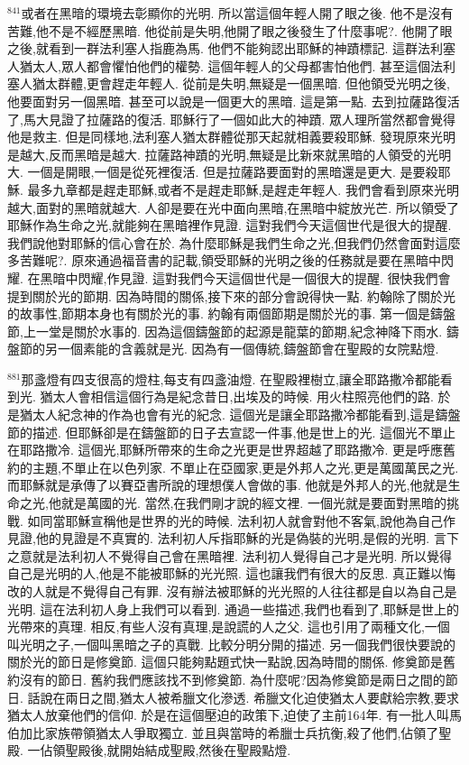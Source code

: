 \documentclass{book}
\begin{document}
$^{841}$或者在黑暗的環境去彰顯你的光明.
所以當這個年輕人開了眼之後.
他不是沒有苦難,他不是不經歷黑暗.
他從前是失明,他開了眼之後發生了什麼事呢?.
他開了眼之後,就看到一群法利塞人指鹿為馬.
他們不能夠認出耶穌的神蹟標記.
這群法利塞人猶太人,眾人都會懼怕他們的權勢.
這個年輕人的父母都害怕他們.
甚至這個法利塞人猶太群體,更會趕走年輕人.
從前是失明,無疑是一個黑暗.
但他領受光明之後,他要面對另一個黑暗.
甚至可以說是一個更大的黑暗.
這是第一點.
去到拉薩路復活了,馬大見證了拉薩路的復活.
耶穌行了一個如此大的神蹟.
眾人理所當然都會覺得他是救主.
但是同樣地,法利塞人猶太群體從那天起就相義要殺耶穌.
發現原來光明是越大,反而黑暗是越大.
拉薩路神蹟的光明,無疑是比新來就黑暗的人領受的光明大.
一個是開眼,一個是從死裡復活.
但是拉薩路要面對的黑暗還是更大.
是要殺耶穌.
最多九章都是趕走耶穌,或者不是趕走耶穌,是趕走年輕人.
我們會看到原來光明越大,面對的黑暗就越大.
人卻是要在光中面向黑暗,在黑暗中綻放光芒.
所以領受了耶穌作為生命之光,就能夠在黑暗裡作見證.
這對我們今天這個世代是很大的提醒.
我們說他對耶穌的信心會在於.
為什麼耶穌是我們生命之光,但我們仍然會面對這麼多苦難呢?.
原來通過福音書的記載,領受耶穌的光明之後的任務就是要在黑暗中閃耀.
在黑暗中閃耀,作見證.
這對我們今天這個世代是一個很大的提醒.
很快我們會提到關於光的節期.
因為時間的關係,接下來的部分會說得快一點.
約翰除了關於光的故事性,節期本身也有關於光的事.
約翰有兩個節期是關於光的事.
第一個是鑄盤節,上一堂是關於水事的.
因為這個鑄盤節的起源是龍葉的節期,紀念神降下雨水.
鑄盤節的另一個素能的含義就是光.
因為有一個傳統,鑄盤節會在聖殿的女院點燈.

$^{881}$那盞燈有四支很高的燈柱,每支有四盞油燈.
在聖殿裡樹立,讓全耶路撒冷都能看到光.
猶太人會相信這個行為是紀念昔日,出埃及的時候.
用火柱照亮他們的路.
於是猶太人紀念神的作為也會有光的紀念.
這個光是讓全耶路撒冷都能看到,這是鑄盤節的描述.
但耶穌卻是在鑄盤節的日子去宣認一件事,他是世上的光.
這個光不單止在耶路撒冷.
這個光,耶穌所帶來的生命之光更是世界超越了耶路撒冷.
更是呼應舊約的主題,不單止在以色列家.
不單止在亞國家,更是外邦人之光,更是萬國萬民之光.
而耶穌就是承傳了以賽亞書所說的理想僕人會做的事.
他就是外邦人的光,他就是生命之光,他就是萬國的光.
當然,在我們剛才說的經文裡.
一個光就是要面對黑暗的挑戰.
如同當耶穌宣稱他是世界的光的時候.
法利初人就會對他不客氣,說他為自己作見證,他的見證是不真實的.
法利初人斥指耶穌的光是偽裝的光明,是假的光明.
言下之意就是法利初人不覺得自己會在黑暗裡.
法利初人覺得自己才是光明.
所以覺得自己是光明的人,他是不能被耶穌的光光照.
這也讓我們有很大的反思.
真正難以悔改的人就是不覺得自己有罪.
沒有辦法被耶穌的光光照的人往往都是自以為自己是光明.
這在法利初人身上我們可以看到.
通過一些描述,我們也看到了,耶穌是世上的光帶來的真理.
相反,有些人沒有真理,是說謊的人之父.
這也引用了兩種文化,一個叫光明之子,一個叫黑暗之子的真戰.
比較分明分開的描述.
另一個我們很快要說的關於光的節日是修奠節.
這個只能夠點題式快一點說,因為時間的關係.
修奠節是舊約沒有的節日.
舊約我們應該找不到修奠節.
為什麼呢?因為修奠節是兩日之間的節日.
話說在兩日之間,猶太人被希臘文化滲透.
希臘文化迫使猶太人要獻給宗教,要求猶太人放棄他們的信仰.
於是在這個壓迫的政策下,迫使了主前164年.
有一批人叫馬伯加比家族帶領猶太人爭取獨立.
並且與當時的希臘士兵抗衡,殺了他們,佔領了聖殿.
一佔領聖殿後,就開始結成聖殿,然後在聖殿點燈.
\end{document}
